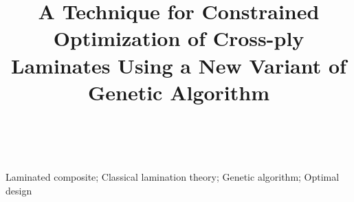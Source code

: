 \documentclass[10pt, journal]{IEEEtran}
\begin{document}
\title{A Technique for Constrained Optimization of Cross-ply Laminates Using a New Variant of Genetic Algorithm}


\author{\\
}



\maketitle

\begin{abstract}
	
\end{abstract}

\begin{IEEEkeywords}
Laminated composite; Classical lamination theory; Genetic algorithm; Optimal design
\end{IEEEkeywords}


\IEEEpeerreviewmaketitle











\end{document}
